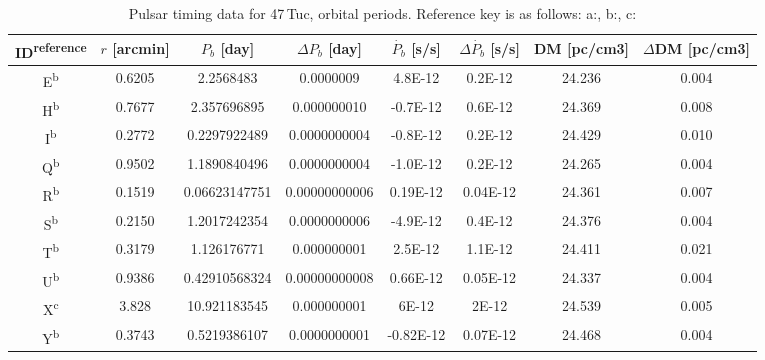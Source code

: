 \begin{table}
    \centering
    \caption{Pulsar timing data for 47\,Tuc, orbital periods. Reference key is as follows:
        a:\citet{Freire2018}, b:\citet{Freire2017}, c:\citet{Ridolfi2016}}

    \begin{tabular}{c c c c c c c c}
        \hline

        ID\textsuperscript{reference} & $r$ [arcmin] & $P_b$ [day]   & $\Delta P_b$ [day] & $\dot{P_b}$ [s/s] & $\Delta \dot{P_b}$ [s/s] & DM [pc/cm3] & $\Delta$DM [pc/cm3] \\

        \hline
        E\textsuperscript{b}          & 0.6205       & 2.2568483     & 0.0000009          & \num{4.8E-12}     & \num{0.2E-12}            & 24.236      & 0.004               \\
        H\textsuperscript{b}          & 0.7677       & 2.357696895   & 0.000000010        & \num{-0.7E-12}    & \num{0.6E-12}            & 24.369      & 0.008               \\
        I\textsuperscript{b}          & 0.2772       & 0.2297922489  & 0.0000000004       & \num{-0.8E-12}    & \num{0.2E-12}            & 24.429      & 0.010               \\
        Q\textsuperscript{b}          & 0.9502       & 1.1890840496  & 0.0000000004       & \num{-1.0E-12}    & \num{0.2E-12}            & 24.265      & 0.004               \\
        R\textsuperscript{b}          & 0.1519       & 0.06623147751 & 0.00000000006      & \num{0.19E-12}    & \num{0.04E-12}           & 24.361      & 0.007               \\
        S\textsuperscript{b}          & 0.2150       & 1.2017242354  & 0.0000000006       & \num{-4.9E-12}    & \num{0.4E-12}            & 24.376      & 0.004               \\
        T\textsuperscript{b}          & 0.3179       & 1.126176771   & 0.000000001        & \num{2.5E-12}     & \num{1.1E-12}            & 24.411      & 0.021               \\
        U\textsuperscript{b}          & 0.9386       & 0.42910568324 & 0.00000000008      & \num{0.66E-12}    & \num{0.05E-12}           & 24.337      & 0.004               \\
        X\textsuperscript{c}          & 3.828        & 10.921183545  & 0.000000001        & \num{6E-12}       & \num{2E-12}              & 24.539      & 0.005               \\
        Y\textsuperscript{b}          & 0.3743       & 0.5219386107  & 0.0000000001       & \num{-0.82E-12}   & \num{0.07E-12}           & 24.468      & 0.004               \\
        \hline
    \end{tabular}

    \label{tab:pulsars_orbital}

\end{table}




